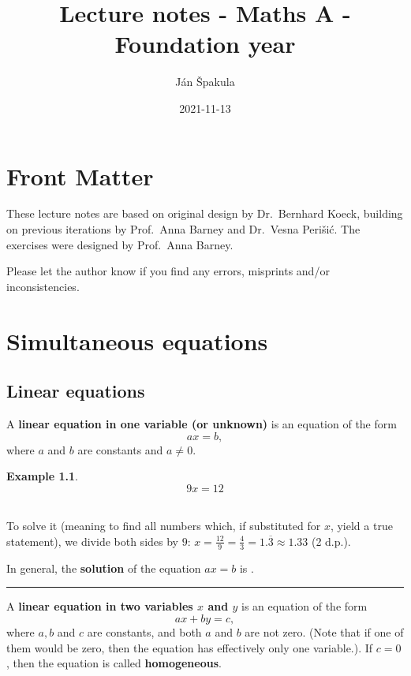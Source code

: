 \documentclass[
  12pt,
  oneside]{book}
\title{Lecture notes - Maths A - Foundation year}
\author{Ján Špakula}
\date{2021-11-13}
\theoremstyle{definition}
\theoremstyle{definition}
\newtheorem{example}{Example}[chapter]
\theoremstyle{definition}
\theoremstyle{definition}
\theoremstyle{remark}
\begin{document}
\maketitle

{
\setcounter{tocdepth}{1}
\tableofcontents
}
\hypertarget{front-matter}{%
\chapter*{Front Matter}\label{front-matter}}

These lecture notes are based on original design by Dr.~Bernhard Koeck, building on previous iterations by Prof.~Anna Barney and Dr.~Vesna Perišić. The exercises were designed by Prof.~Anna Barney.

Please let the author know if you find any errors, misprints and/or inconsistencies.

\hypertarget{simeq}{%
\chapter{Simultaneous equations}\label{simeq}}

\hypertarget{linear-equations}{%
\section{Linear equations}\label{linear-equations}}

A \textbf{linear equation in one variable (or unknown)} is an equation of the form
\[ax=b,\]
where \(a\) and \(b\) are constants and \(a\neq 0\).

\begin{example}
\protect\hypertarget{exm:unnamed-chunk-3}{}{\label{exm:unnamed-chunk-3} }\[9x=12\]\\
\end{example}
To solve it (meaning to find all numbers which, if substituted for \(x\), yield a true statement), we divide both sides by \(9\): \(x = \frac{12}{9} = \frac{4}{3} = 1.\overline{3} \approx 1.33\) (2 d.p.).

In general, the \textbf{solution} of the equation \(ax=b\) is .

\begin{center}\rule{0.5\linewidth}{0.5pt}\end{center}

A \textbf{linear equation in two variables \(x\) and \(y\)} is an equation of the form
\[ax+by=c,\]
where \(a,b\) and \(c\) are constants, and both \(a\) and \(b\) are not zero. (Note that if one of them would be zero, then the equation has effectively only one variable.). If \(c=0\), then the equation is called \textbf{homogeneous}.
\end{document}
